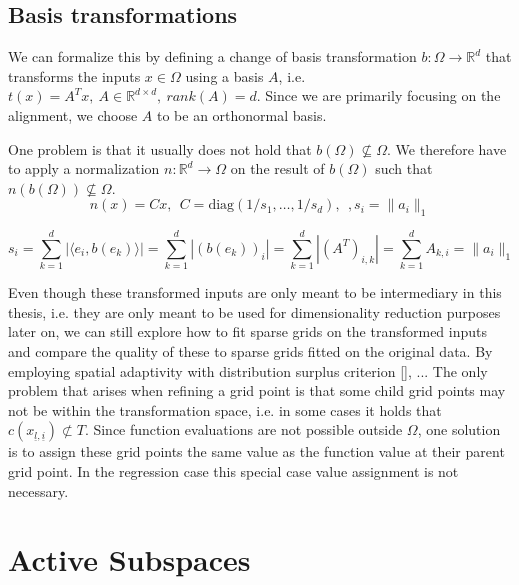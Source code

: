 \documentclass[
  a4paper,  %
  twoside,  %
  bibliography=totoc,
  headsepline,
  cleardoublepage=empty,
  parskip=half,
  draft=false
]{scrbook}
\begin{document}

\section{Basis transformations}

We can formalize this by defining a change of basis transformation $b \colon \Omega \to \mathds{R}^d$ that transforms the inputs $x \in \Omega$ using a basis $A$, i.e. $t(x)=A^Tx, ~ A \in \mathds{R}^{d \times d}, ~ rank(A)=d$.
Since we are primarily focusing on the alignment, we choose $A$ to be an orthonormal basis.

One problem is that it usually does not hold that $b(\Omega) \nsubseteq \Omega$.
We therefore have to apply a normalization $n \colon \mathds{R}^d \to \Omega$ on the result of $b(\Omega)$ such that $n(b(\Omega)) \nsubseteq \Omega$.
\begin{equation}
n(x)=Cx , ~~
C=\text{diag}(1 / s_1, \dots, 1 / s_d), ~~, s_i = \|a_i\|_1
\label{alignment}
\end{equation}

\begin{equation}
s_i=\sum_{k=1}^d |\langle e_i, b(e_k) \rangle| = \sum_{k=1}^d |(b(e_k))_i| = \sum_{k=1}^d |(A^T)_{i,k}| = \sum_{k=1}^d A_{k,i}= \|a_i\|_1
\end{equation}

Even though these transformed inputs are only meant to be intermediary in this thesis, i.e. they are only meant to be used for dimensionality reduction purposes later on, we can still explore how to fit sparse grids on the transformed inputs and compare the quality of these to sparse grids fitted on the original data.
By employing spatial adaptivity with distribution surplus criterion \eqref{}, ...
The only problem that arises when refining a grid point is that some child grid points may not be within the transformation space, i.e. in some cases it holds that $c(x_{\underline{l},\underline{i}}) \nsubset T$.
Since function evaluations are not possible outside $\Omega$, one solution is to assign these grid points the same value as the function value at their parent grid point.
In the regression case this special case value assignment is not necessary.

\chapter{Active Subspaces}
\end{document}
